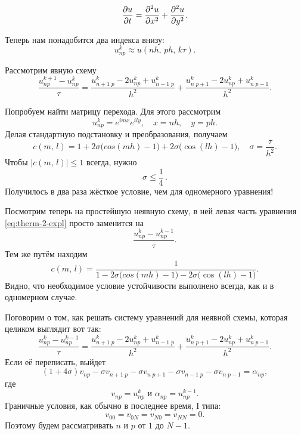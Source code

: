 \documentclass{trlnotes}
\begin{document}
\begin{de}
	\[
		\dfrac{\partial u}{\partial t} = \dfrac{\partial^2 u}{\partial x^2} + \dfrac{\partial^2 u}{\partial y^2}.
	\]
\end{de}

Теперь нам понадобится два индекса внизу:
\[
	u^k_{np} \approx u(nh, \, ph, \, k\tau).
\]

Рассмотрим явную схему
\begin{equation}\label{eq:therm-2-expl}
	\dfrac{u^{k+1}_{np} - u^k_{np}}{\tau} = \dfrac{u^k_{n+1 \; p} - 2u^k_{np} + u^k_{n-1 \; p}}{h^2} + \dfrac{u^k_{n \; p+1} - 2u^k_{np} + u^k_{n \; p - 1}}{h^2}.
\end{equation}

Попробуем найти матрицу перехода. Для этого рассмотрим 
\[
	u^k_{np} = e^{imx} e^{ily}, \quad x = nh, \quad y = ph.
\]
Делая стандартную подстановку и преобразования, получаем
\[
	c(m, \, l) = 1 + 2\sigma\big(cos(mh) - 1\big) + 2\sigma\big(\cos(lh) - 1\big), \quad \sigma = \dfrac{\tau}{h^2}.
\]
Чтобы $\big|c(m, \, l)\big| \leqslant 1$ всегда, нужно
\[
	\boxed{\sigma \leqslant \dfrac{1}{4}}\,.
\]
Получилось в два раза жёсткое условие, чем для одномерного уравнения!

Посмотрим теперь на простейшую неявную схему, в ней левая часть уравнения \ref{eq:therm-2-expl} просто заменится на
\[
	\dfrac{u^{k}_{np} - u^{k-1}_{np}}{\tau}.
\]
Тем же путём находим
\[ 
	c(m, \, l) = \dfrac{1}{1 - 2\sigma\big(cos(mh) - 1\big) - 2\sigma\big(\cos(lh) - 1\big)}.
\]
Видно, что необходимое условие устойчивости выполнено всегда, как и в одномерном случае.

Поговорим о том, как решать систему уравнений для неявной схемы, которая целиком выглядит вот так:
\[
	\dfrac{u^{k}_{np} - u^{k-1}_{np}}{\tau} = \dfrac{u^k_{n+1 \; p} - 2u^k_{np} + u^k_{n-1 \; p}}{h^2} + \dfrac{u^k_{n \; p+1} - 2u^k_{np} + u^k_{n \; p - 1}}{h^2}.
\]
Если её переписать, выйдет
\[
	(1 + 4\sigma) v_{np} - \sigma v_{n + 1\; p} - \sigma v_{n \; p+1} - \sigma v_{n - 1\; p} - \sigma v_{n \; p-1} = \alpha_{np},
\]
где
\[
	v_{np} = u_{np}^k \text{ и } \alpha_{np} = u^{k-1}_{np}.
\]
Граничные условия, как обычно в последнее время, I типа:
\[
	v_{00} = v_{0N} = v_{N0} = v_{NN} = 0.
\]
Поэтому будем рассматривать $n$ и $p$ от $1$ до $N-1$. 
\end{document}
